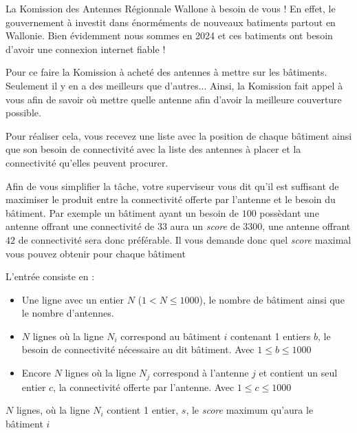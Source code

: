 \problemname{\problemyamlname}


\newcommand{\maxa}{123456789}

La Komission des Antennes Régionnale Wallone à besoin de vous ! En effet, le gouvernement à investit dans énorméments de nouveaux batiments partout en Wallonie. Bien évidemment nous sommes en 2024 et ces batiments ont besoin d'avoir une connexion internet fiable !

Pour ce faire la Komission à acheté des antennes à mettre sur les bâtiments. Seulement il y en a des meilleurs que d'autres... Ainsi, la Komission fait appel à vous afin de savoir où mettre quelle antenne afin d'avoir la meilleure couverture possible.

Pour réaliser cela, vous recevez une liste avec la position de chaque bâtiment ainsi que son besoin de connectivité avec la liste des antennes à placer et la connectivité qu'elles peuvent procurer.

Afin de vous simplifier la tâche, votre superviseur vous dit qu'il est suffisant de maximiser le produit entre la connectivité offerte par l'antenne et le besoin du bâtiment. Par exemple un bâtiment ayant un besoin de \(100\) possèdant une antenne offrant une connectivité de \(33\) aura un \textit{score} de \(3300\), une antenne offrant \(42\) de connectivité sera donc préférable. Il vous demande donc quel \textit{score} maximal vous pouvez obtenir pour chaque bâtiment

\begin{Input}
    L'entrée consiste en :
    \begin{itemize}
        \item Une ligne avec un entier \(N\) (\(1 < N \leq 1000\)), le nombre de bâtiment ainsi que le nombre d'antennes.
      \item \(N\) lignes où la ligne \(N_{i}\) correspond au bâtiment \(i\) contenant 1 entiers \(b\), le besoin de connectivité nécessaire au dit bâtiment. Avec \(1 \leq b \leq 1000\)
      \item Encore \(N\) lignes où la ligne \(N_{j}\) correspond à l'antenne \(j\) et contient un seul entier \(c\), la connectivité offerte par l'antenne. Avec \(1 \leq c \leq 1000\)
    \end{itemize}
\end{Input}

\begin{Output}
  \(N\) lignes, où la ligne \(N_{i}\) contient 1 entier, \(s\), le \textit{score} maximum qu'aura le bâtiment \(i\)
\end{Output}
